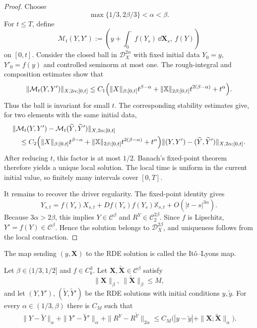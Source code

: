 \begin{proof}
Choose
\[
  \max\{1/3,2\beta/3\}<\alpha<\beta.
\]
For $t\le T$, define
\[
 \mathcal M_t(Y,Y')
 :=\left(y+\int_0^\cdot f(Y_s)\,\dd\mathbf X_s,\ f(Y)\right)
\]
on $[0,t]$.  Consider the closed ball in $\mathscr D_X^{2\alpha}$ with fixed
initial data $Y_0=y$, $Y'_0=f(y)$ and controlled seminorm at most one.  The
rough-integral and composition estimates show that
\[
 \|\mathcal M_t(Y,Y')\|_{X,2\alpha;[0,t]}
 \le C_1\Bigl(
  \|X\|_{\beta;[0,t]}t^{\beta-\alpha}
 +\|\mathbb X\|_{2\beta;[0,t]}t^{2(\beta-\alpha)}
 +t^\alpha\Bigr).
\]
Thus the ball is invariant for small $t$.  The corresponding stability
estimates give, for two elements with the same initial data,
\begin{align*}
&\|\mathcal M_t(Y,Y')-\mathcal M_t(\widetilde Y,\widetilde Y')
  \|_{X,2\alpha;[0,t]}\\
&\quad\le C_2\Bigl(
  \|X\|_{\beta;[0,t]}t^{\beta-\alpha}
 +\|\mathbb X\|_{2\beta;[0,t]}t^{2(\beta-\alpha)}
 +t^\alpha\Bigr)
 \|(Y,Y')-(\widetilde Y,\widetilde Y')\|_{X,2\alpha;[0,t]}.
\end{align*}
After reducing $t$, this factor is at most $1/2$.  Banach's fixed-point theorem
therefore yields a unique local solution.  The local time is uniform in the
current initial value, so finitely many intervals cover $[0,T]$.

It remains to recover the driver regularity.  The fixed-point identity gives
\[
 Y_{s,t}=f(Y_s)X_{s,t}+Df(Y_s)f(Y_s)\mathbb X_{s,t}
          +O(|t-s|^{3\alpha}).
\]
Because $3\alpha>2\beta$, this implies $Y\in\mathcal C^\beta$ and
$R^Y\in\mathcal C_2^{2\beta}$.  Since $f$ is Lipschitz,
$Y'=f(Y)\in\mathcal C^\beta$.  Hence the solution belongs to
$\mathscr D_X^{2\beta}$, and uniqueness follows from the local contraction.
\end{proof}

The map sending $(y,\mathbf X)$ to the RDE solution is called the
It\^o--Lyons map.

\begin{thm}
Let $\beta\in(1/3,1/2]$ and $f\in C_b^3$.  Let
$\mathbf X,\widetilde{\mathbf X}\in\mathscr C^\beta$ satisfy
\[
  \|\mathbf X\|_\beta,\ \|\widetilde{\mathbf X}\|_\beta\le M,
\]
and let $(Y,Y')$, $(\widetilde Y,\widetilde Y')$ be the RDE solutions with
initial conditions $y,\widetilde y$.  For every
$\alpha\in(1/3,\beta)$ there is $C_M$ such that
\begin{align*}
 \|Y-\widetilde Y\|_\alpha
 +\|Y'-\widetilde Y'\|_\alpha
 +\|R^Y-R^{\widetilde Y}\|_{2\alpha}
 \le C_M\bigl(|y-\widetilde y|
              +\|\mathbf X;\widetilde{\mathbf X}\|_\alpha\bigr).
\end{align*}
\end{thm}


